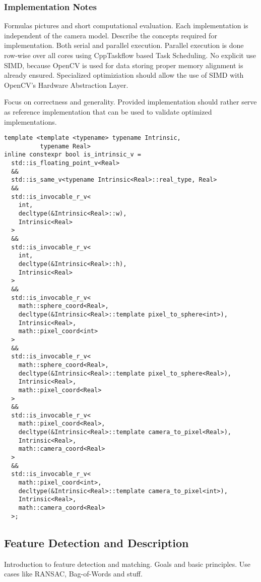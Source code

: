 \subsubsection{Implementation Notes}

Formulas pictures and short computational evaluation.
Each implementation is independent of the camera model.
Describe the concepts required for implementation.
Both serial and parallel execution.
Parallel execution is done row-wise over all cores using CppTaskflow based Task Scheduling.
No explicit use SIMD, because OpenCV\cite{opencv_library} is used for data storing proper memory alignment is already ensured.
Specialized optimiziation should allow the use of SIMD with OpenCV's Hardware Abstraction Layer.

Focus on correctness and generality.
Provided implementation should rather serve as reference implementation that can be used to validate optimized implementations.

\begin{lstlisting}
template <template <typename> typename Intrinsic,
          typename Real>
inline constexpr bool is_intrinsic_v =
  std::is_floating_point_v<Real>
  &&
  std::is_same_v<typename Intrinsic<Real>::real_type, Real>
  &&
  std::is_invocable_r_v<
    int,
    decltype(&Intrinsic<Real>::w),
    Intrinsic<Real>
  >
  &&
  std::is_invocable_r_v<
    int,
    decltype(&Intrinsic<Real>::h),
    Intrinsic<Real>
  >
  &&
  std::is_invocable_r_v<
    math::sphere_coord<Real>,
    decltype(&Intrinsic<Real>::template pixel_to_sphere<int>),
    Intrinsic<Real>,
    math::pixel_coord<int>
  >
  &&
  std::is_invocable_r_v<
    math::sphere_coord<Real>,
    decltype(&Intrinsic<Real>::template pixel_to_sphere<Real>),
    Intrinsic<Real>,
    math::pixel_coord<Real>
  >
  &&
  std::is_invocable_r_v<
    math::pixel_coord<Real>,
    decltype(&Intrinsic<Real>::template camera_to_pixel<Real>),
    Intrinsic<Real>,
    math::camera_coord<Real>
  >
  &&
  std::is_invocable_r_v<
    math::pixel_coord<int>,
    decltype(&Intrinsic<Real>::template camera_to_pixel<int>),
    Intrinsic<Real>,
    math::camera_coord<Real>
  >;
\end{lstlisting}

\subsection{Feature Detection and Description}

Introduction to feature detection and matching.
Goals and basic principles.
Use cases like RANSAC, Bag-of-Words and stuff.

